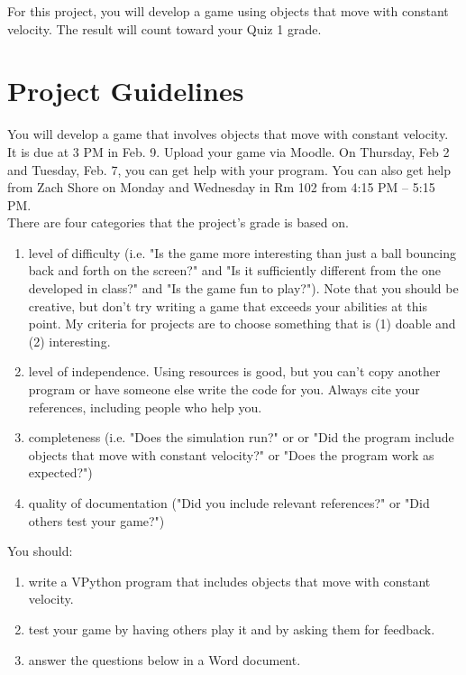 

\longgoal

For this project, you will develop a game using objects that move with constant velocity. The result will count toward your Quiz 1 grade.

\section*{Project Guidelines}

You will develop a game that involves objects that move with constant velocity. It is due at 3 PM in Feb. 9. Upload your game via Moodle. On Thursday, Feb 2 and Tuesday, Feb. 7, you can get help with your program. You can also get help from Zach Shore on Monday and Wednesday in Rm 102 from 4:15 PM -- 5:15 PM.\\

\noindent
There are four categories that the project's grade is based on.

\begin{enumerate}
	\item level of difficulty (i.e. "Is the game more interesting than just a ball bouncing back and forth on the screen?" and "Is it sufficiently different from the one developed in class?" and "Is the game fun to play?").  Note that you should be creative, but don't try writing a game that exceeds your abilities at this point. My criteria for projects are to choose something that is (1) doable and (2) interesting.
	\item level of independence.  Using resources is good, but you can't copy another program or have someone else write the code for you. Always cite your references, including people who help you.
	\item completeness (i.e.  "Does the simulation run?" or  or "Did the program include objects that move with constant velocity?" or "Does the program work as expected?")
	\item quality of documentation ("Did you include relevant references?" or "Did others test your game?")
\end{enumerate}

\noindent
You should:

\begin{enumerate}
	\item write a VPython program that includes objects that move with constant velocity.
	\item test your game by having others play it and by asking them for feedback.
	\item answer the questions below in a Word document.
\end{enumerate}

